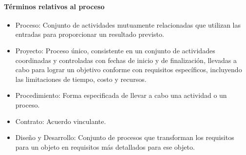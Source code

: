 		\paragraph{Términos relativos al proceso}
			\begin{itemize}
				\item Proceso: Conjunto de actividades mutuamente relacionadas que utilizan las entradas para proporcionar un
				resultado previsto.
				
				\item Proyecto: Proceso único, consistente en un conjunto de actividades coordinadas y controladas con fechas
				de inicio y de finalización, llevadas a cabo para lograr un objetivo conforme con requisitos específicos, incluyendo las limitaciones de tiempo, costo y recursos.
				
				\item Procedimiento: Forma especificada de llevar a cabo una actividad o un proceso.
				
				\item Contrato: Acuerdo vinculante.
				
\newpage
\thispagestyle{plain}
				
				\item Diseño y Desarrollo: Conjunto de procesos que transforman los requisitos para un objeto en requisitos más detallados para ese objeto.
			\end{itemize}
		
